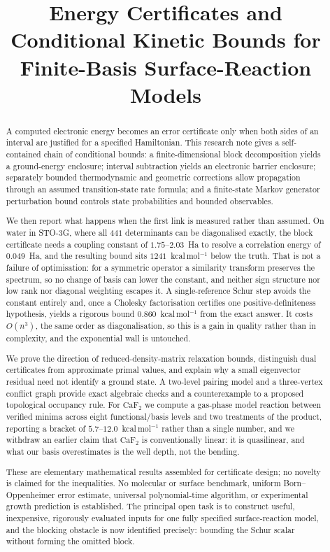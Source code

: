 \documentclass[11pt,a4paper]{article}
\title{Energy Certificates and Conditional Kinetic Bounds for
Finite-Basis Surface-Reaction Models}
\author{}
\date{}
\theoremstyle{plain}
\theoremstyle{definition}
\theoremstyle{remark}
\begin{document}
\maketitle

\begin{abstract}
A computed electronic energy becomes an error certificate only when both
sides of an interval are justified for a specified Hamiltonian. This research
note gives a self-contained chain of conditional bounds: a finite-dimensional
block decomposition yields a ground-energy enclosure; interval subtraction
yields an electronic barrier enclosure; separately bounded thermodynamic and
geometric corrections allow propagation through an assumed transition-state
rate formula; and a finite-state Markov generator perturbation bound controls
state probabilities and bounded observables.

We then report what happens when the first link is measured rather than assumed.
On water in STO-3G, where all $441$ determinants can be diagonalised exactly, the
block certificate needs a coupling constant of $1.75$--$2.03$~Ha to resolve a
correlation energy of $0.049$~Ha, and the resulting bound sits $1241$~kcal\,mol$^{-1}$
below the truth. That is not a failure of optimisation: for a symmetric operator a
similarity transform preserves the spectrum, so no change of basis can lower the
constant, and neither sign structure nor low rank nor diagonal weighting escapes
it. A single-reference Schur step avoids the constant entirely and, once a Cholesky
factorisation certifies one positive-definiteness hypothesis, yields a rigorous
bound $0.860$~kcal\,mol$^{-1}$ from the exact answer. It costs $O(n^3)$, the same
order as diagonalisation, so this is a gain in quality rather than in complexity,
and the exponential wall is untouched.

We prove the direction of reduced-density-matrix relaxation bounds, distinguish
dual certificates from approximate primal values, and explain why a small
eigenvector residual need not identify a ground state. A two-level pairing model
and a three-vertex conflict graph provide exact algebraic checks and a
counterexample to a proposed topological occupancy rule. For $\mathrm{CaF_2}$ we
compute a gas-phase model reaction between verified minima across eight
functional/basis levels and two treatments of the product, reporting a bracket of
$5.7$--$12.0$~kcal\,mol$^{-1}$ rather than a single number, and we withdraw an
earlier claim that $\mathrm{CaF_2}$ is conventionally linear: it is quasilinear, and
what our basis overestimates is the well depth, not the bending.

These are elementary mathematical results assembled for certificate design; no
novelty is claimed for the inequalities. No molecular or surface benchmark, uniform
Born--Oppenheimer error estimate, universal polynomial-time algorithm, or
experimental growth prediction is established. The principal open task is to
construct useful, inexpensive, rigorously evaluated inputs for one fully
specified surface-reaction model, and the blocking obstacle is now identified
precisely: bounding the Schur scalar without forming the omitted block.
\end{abstract}
\end{document}
